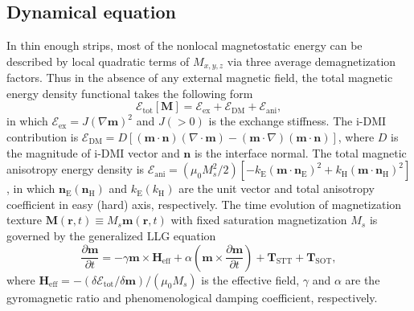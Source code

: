\documentclass[12pt]{iopart}
\begin{document}
\subsection{Dynamical equation}
In thin enough strips, most of the nonlocal magnetostatic energy can be described by local
quadratic terms of $M_{x,y,z}$ via three average demagnetization factors.
Thus in the absence of any external magnetic field, the total magnetic energy density functional 
takes the following form
\begin{equation}\label{E_tot_density}
\mathcal{E}_{\mathrm{tot}}[\mathbf{M}] =\mathcal{E}_{\mathrm{ex}}+\mathcal{E}_{\mathrm{DM}}+\mathcal{E}_{\mathrm{ani}},
\end{equation}
in which $\mathcal{E}_{\mathrm{ex}}=J(\nabla\mathbf{m})^2$ and $J(>0)$ is the exchange stiffness. 
The i-DMI contribution is $\mathcal{E}_{\mathrm{DM}}=D[(\mathbf{m}\cdot\mathbf{n})(\nabla\cdot \mathbf{m})-(\mathbf{m}\cdot\nabla)(\mathbf{m}\cdot\mathbf{n})]$, where $D$ is the magnitude of
i-DMI vector and $\mathbf{n}$ is the interface normal. 
The total magnetic anisotropy energy density is 
$\mathcal{E}_{\mathrm{ani}}=(\mu_0 M_s^2/2)[-k_{\mathrm{E}}(\mathbf{m}\cdot\mathbf{n}_{\mathrm{E}})^2 +k_{\mathrm{H}} (\mathbf{m}\cdot\mathbf{n}_{\mathrm{H}})^2]$, 
in which $\mathbf{n}_{\mathrm{E}}(\mathbf{n}_{\mathrm{H}})$ and $k_{\mathrm{E}}(k_{\mathrm{H}})$ are the unit vector
and total anisotropy coefficient in easy (hard) axis, respectively.
The time evolution of magnetization texture
$\mathbf{M}(\mathbf{r},t)\equiv M_s\mathbf{m}(\mathbf{r},t)$
with fixed saturation magnetization $M_s$ is governed by the generalized
LLG equation
\begin{equation}\label{LLG_vector}
\frac{\partial \mathbf{m}}{\partial t}=-\gamma \mathbf{m}\times \mathbf{H}_{\mathrm{eff}}
+\alpha\left(\mathbf{m}\times\frac{\partial \mathbf{m}}{\partial t}\right)
+\mathbf{T}_{\mathrm{STT}}+\mathbf{T}_{\mathrm{SOT}},
\end{equation}
where $\mathbf{H}_{\mathrm{eff}}=-(\delta \mathcal{E}_{\mathrm{tot}}/\delta \mathbf{m})/(\mu_{0}M_s)$
is the effective field, $\gamma$ and $\alpha$ are the gyromagnetic ratio and
phenomenological damping coefficient, respectively.
\end{document}
